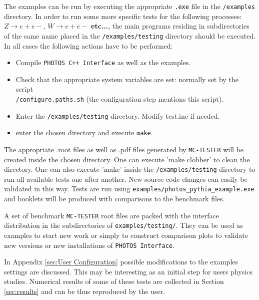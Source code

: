 \documentclass[]{Photos_interface_design}
\begin{document}
The examples can be run by executing the appropriate {\tt .exe} file in the {\tt /examples} directory.
In order to run some more specific tests for the following processes:
$Z \rightarrow e+e-$, $W \rightarrow e+e-$ {\bf etc...}, the main programs residing
in subdirectories of the same name placed in the {\tt /examples/testing} directory
should be executed. In all cases the following actions have to be performed:

\begin{itemize}
  \item Compile {\tt PHOTOS C++ Interface} as well as the examples. 
 \item  Check that the appropriate system variables are set: normally set by the script \\
{\tt /configure.paths.sh} (the configuration step mentions this script).
  \item Enter the {\tt /examples/testing} directory. Modify test.inc if needed.
  \item enter the chosen directory and execute {\tt make}.
\end{itemize}

The appropriate .root files as well as .pdf files generated by {\tt MC-TESTER}
will be created inside the chosen directory. One can execute 'make clobber' to
clean the directory. One can also execute 'make' inside the {\tt /examples/testing}
directory to run all available tests one after another. New source
code changes can easily be validated in this way.
Tests are run using {\tt examples/photos\_pythia\_example.exe} 
and booklets will be produced with comparisons to the benchmark files.

A set of benchmark {\tt MC-TESTER} root files are packed with the interface
distribution in the subdirectories of {\tt examples/testing/}. They can be used
as examples to start new work or simply to construct comparison
plots to validate new versions or new installations of {\tt PHOTOS Interface}. 

In Appendix \ref{sec:User Configuration} possible modifications to the  
examples settings are discussed. This may be interesting as an initial step for users 
physics studies.  Numerical results of some of these tests are collected in Section \ref{sec:results}
and can be thus reproduced by the user.
\end{document}
